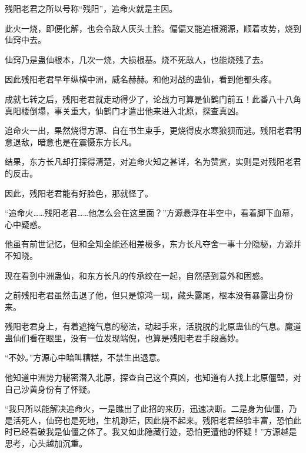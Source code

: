 \begin{this_body}
残阳老君之所以号称“残阳”，追命火就是主因。

此火一烧，即便化解，也会令敌人灰头土脸。偏偏又能追根溯源，顺着攻势，烧到仙窍中去。

仙窍乃是蛊仙根本，几次一烧，大损根基。烧不死敌人，也能烧残了去。

因此残阳老君早年纵横中洲，威名赫赫。和他对战的蛊仙，看到他都头疼。

成就七转之后，残阳老君就走动得少了，论战力可算是仙鹤门前五！此番八十八角真阳楼倒塌，事关重大，仙鹤门才遣出他来进入北原，探查真凶。

追命火一出，果然烧得方源、自在书生束手，更烧得皮水寒狼狈而逃。残阳老君明意退敌，暗意也是在震慑东方长凡。

结果，东方长凡却打探得清楚，对追命火知之甚详，名为赞赏，实则是对残阳老君的反击。

因此，残阳老君能有好脸色，那就怪了。

“追命火……残阳老君……他怎么会在这里面？”方源悬浮在半空中，看着脚下血幕，心中疑惑。

他虽有前世记忆，但和全知全能还相差极多，东方长凡夺舍一事十分隐秘，方源并不知晓。

现在看到中洲蛊仙，和东方长凡的传承绞在一起，自然感到意外和困惑。

之前残阳老君虽然击退了他，但只是惊鸿一现，藏头露尾，根本没有暴露出身份来。

残阳老君身上，有着遮掩气息的秘法，动起手来，活脱脱的北原蛊仙的气息。魔道蛊仙们看在眼里，没有一位发现端倪，也算是残阳老君手段高妙。

“不妙。”方源心中暗叫糟糕，不禁生出退意。

他知道中洲势力秘密潜入北原，探查自己这个真凶，也知道有人找上北原僵盟，对自己沙黄身份有了怀疑。

“我只所以能解决追命火，一是瞧出了此招的来历，迅速决断。二是身为仙僵，乃是活死人，仙窍也是死地，生机渺茫，因此烧不起来。残阳老君经验丰富，恐怕此时已经看破我是仙僵之体了。我又如此隐藏行迹，恐怕更遭他的怀疑！”方源越是思考，心头越加沉重。

\end{this_body}

